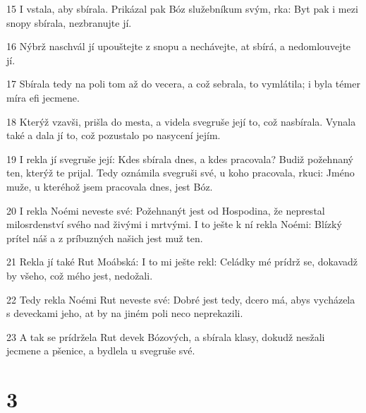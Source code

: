 \par 15 I vstala, aby sbírala. Prikázal pak Bóz služebníkum svým, rka: Byt pak i mezi snopy sbírala, nezbranujte jí.
\par 16 Nýbrž naschvál jí upouštejte z snopu a nechávejte, at sbírá, a nedomlouvejte jí.
\par 17 Sbírala tedy na poli tom až do vecera, a což sebrala, to vymlátila; i byla témer míra efi jecmene.
\par 18 Kterýž vzavši, prišla do mesta, a videla svegruše její to, což nasbírala. Vynala také a dala jí to, což pozustalo po nasycení jejím.
\par 19 I rekla jí svegruše její: Kdes sbírala dnes, a kdes pracovala? Budiž požehnaný ten, kterýž te prijal. Tedy oznámila svegruši své, u koho pracovala, rkuci: Jméno muže, u kteréhož jsem pracovala dnes, jest Bóz.
\par 20 I rekla Noémi neveste své: Požehnanýt jest od Hospodina, že neprestal milosrdenství svého nad živými i mrtvými. I to ješte k ní rekla Noémi: Blízký prítel náš a z príbuzných našich jest muž ten.
\par 21 Rekla jí také Rut Moábská: I to mi ješte rekl: Celádky mé prídrž se, dokavadž by všeho, což mého jest, nedožali.
\par 22 Tedy rekla Noémi Rut neveste své: Dobré jest tedy, dcero má, abys vycházela s deveckami jeho, at by na jiném poli neco neprekazili.
\par 23 A tak se prídržela Rut devek Bózových, a sbírala klasy, dokudž nesžali jecmene a pšenice, a bydlela u svegruše své.

\chapter{3}

